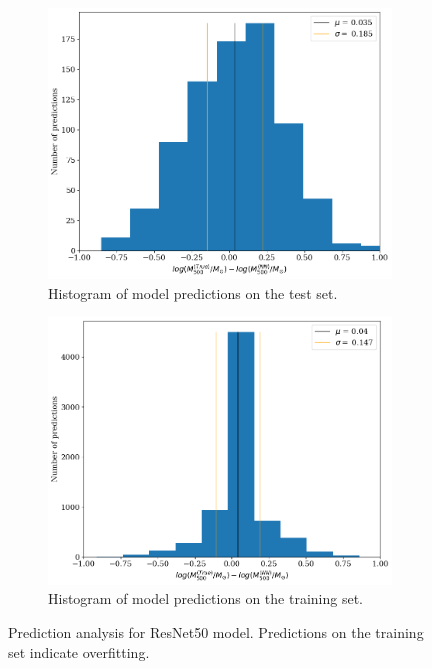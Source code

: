 \begin{figure}[H]
\begin{subfigure}{.46\textwidth}
  \centering
  \includegraphics[width=\linewidth]{images/Chapter4/ResNet50/res50_best_test_hist.png}
  \caption{Histogram of model predictions on the test set.}
  \label{fig:best_perf_resnet50_c}
\end{subfigure}%
\hspace{.6em}
\begin{subfigure}{.46\textwidth}
  \centering
  \includegraphics[width=\linewidth]{images/Chapter4/ResNet50/res50_best_train_hist.png}
  \caption{Histogram of model predictions on the training set.}
  \label{fig:best_perf_resnet50_d}
\end{subfigure}
\caption{Prediction analysis for ResNet50 model. Predictions on the training set indicate overfitting.} 
\label{fig:best_perf_resnet50}
\end{figure}

